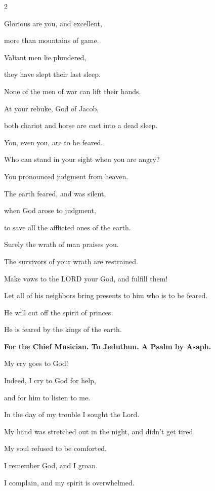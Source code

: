 \begin{multicols}{2}
	
	\myverse{}Glorious are you, and excellent,
	
	more than mountains of game.
	
	
	\myverse{}Valiant men lie plundered,
	
	they have slept their last sleep.
	
	None of the men of war can lift their hands.
	
	
	\myverse{}At your rebuke, God of Jacob,
	
	both chariot and horse are cast into a dead sleep.
	
	
	\myverse{}You, even you, are to be feared.
	
	Who can stand in your sight when you are angry?
	
	
	\myverse{}You pronounced judgment from heaven.
	
	The earth feared, and was silent,
	
	
	\myverse{}when God arose to judgment,
	
	to save all the afflicted ones of the earth.
	
	\vspace{\baselineskip}
	
	
	\myverse{}Surely the wrath of man praises you.
	
	The survivors of your wrath are restrained.
	
	
	\myverse{}Make vows to the LORD your God, and fulfill them!
	
	Let all of his neighbors bring presents to him who is to be feared.
	
	
	\myverse{}He will cut off the spirit of princes.
	
	He is feared by the kings of the earth.
	
	
	
	\mychapter{}\textbf{For the Chief Musician. To Jeduthun. A Psalm by Asaph.}
	
	\myverse*{}My cry goes to God!
	
	Indeed, I cry to God for help,
	
	and for him to listen to me.
	
	
	\myverse{}In the day of my trouble I sought the Lord.
	
	My hand was stretched out in the night, and didn’t get tired.
	
	My soul refused to be comforted.
	
	
	\myverse{}I remember God, and I groan.
	
	I complain, and my spirit is overwhelmed.


\end{multicols}
